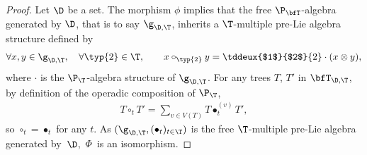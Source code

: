 \begin{proof}
Let $\D$ be a set. The morphism $\phi$ implies that the free $\P_\bfT$-algebra generated by $\D$,
that is to say $\g_{\D,\T}$, inherits
a $\T$-multiple pre-Lie algebra structure defined by
\begin{gather*}
\forall x,y\in \g_{\D,\T},\quad \forall \typ{2}\in \T,\qquad
x\circ_{\typ{2}} y=\tddeux{$1$}{$2$}{2}\cdot(x\otimes y),
\end{gather*}
where $\cdot$ is the $\P_\T$-algebra structure of $\g_{\D,\T}$.
For any trees $T$, $T'$ in $\bfT_{\D,\T}$, by definition of the operadic composition of $\P_\T$,
\begin{gather*}
T\circ_t T'=\sum_{v\in V(T)} T\bullet_t^{(v)} T',
\end{gather*}
so $\circ_t=\bullet_t$ for any $t$. As $(\g_{\D,\T},(\bullet_t)_{t\in \T})$
is the free $\T$-multiple pre-Lie algebra generated by~$\D$,~$\Phi$~is an isomorphism.
\end{proof}
